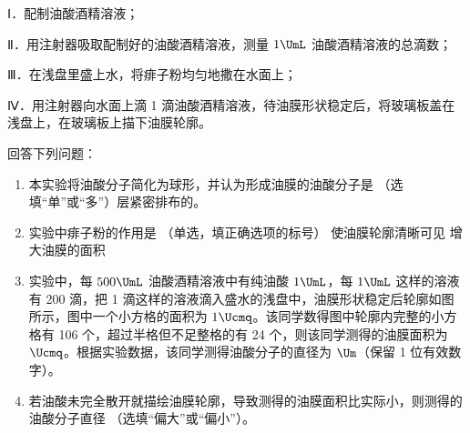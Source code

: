 \documentclass[\gkver]{gaokaozhenti}
\begin{document}
\begin{enumerate}
Ⅰ．配制油酸酒精溶液；

Ⅱ．用注射器吸取配制好的油酸酒精溶液，测量 $1 \UmL$ 油酸酒精溶液的总滴数；

Ⅲ．在浅盘里盛上水，将痱子粉均匀地撒在水面上；

Ⅳ．用注射器向水面上滴 1 滴油酸酒精溶液，待油膜形状稳定后，将玻璃板盖在浅盘上，在玻璃板上描下油膜轮廓。

回答下列问题：
\begin{enumerate}
	\item
	本实验将油酸分子简化为球形，并认为形成油膜的油酸分子是 （选填“单”或“多”）层紧密排布的。
	\item
	实验中痱子粉的作用是 （单选，填正确选项的标号）
{使油膜轮廓清晰可见}
{增大油膜的面积}
	\item
	实验中，每 $500 \UmL$ 油酸酒精溶液中有纯油酸 $1 \UmL$，每 $1 \UmL$ 这样的溶液有 200 滴，把 1 滴这样的溶液滴入盛水的浅盘中，油膜形状稳定后轮廓如图所示，图中一个小方格的面积为 $1 \Ucmq$。该同学数得图中轮廓内完整的小方格有 106 个，超过半格但不足整格的有 24 个，则该同学测得的油膜面积为  $\Ucmq$。根据实验数据，该同学测得油酸分子的直径为  $\Um$（保留 1 位有效数字）。
	\item
	若油酸未完全散开就描绘油膜轮廓，导致测得的油膜面积比实际小，则测得的油酸分子直径 （选填“偏大”或“偏小”）。
\end{enumerate}

\end{enumerate}
\end{document}
